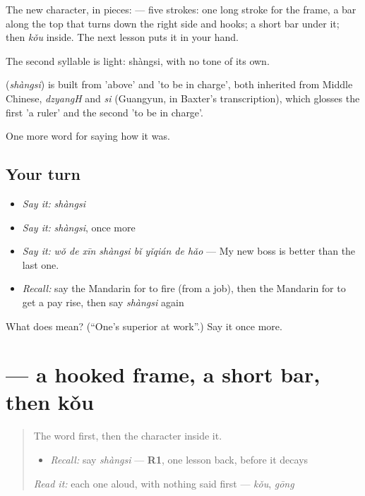 The new character, in pieces:  — five strokes: one long stroke for the frame, a bar along the top that turns down the right side and hooks; a short bar under it; then  \emph{kǒu} inside. The next lesson puts it in your hand.

The second syllable is light: shàngsi, with no tone of its own.

\begin{cousinweb}
\textbf{} (\emph{shàngsi}) is built from  'above' and  'to be in charge', both inherited from Middle Chinese, \emph{dzyangH} and \emph{si} (Guangyun, in Baxter's transcription), which glosses the first 'a ruler' and the second 'to be in charge'.
\end{cousinweb}

\begin{grammarlens}[title={What you've built}]
One more word for saying how it was.
\end{grammarlens}

\subsection*{Your turn}
\begin{itemize}
\raggedright
  \item \emph{Say it:} \emph{shàngsi}
  \item \emph{Say it:} \emph{shàngsi}, once more
  \item \emph{Say it:} \emph{wǒ de xīn shàngsi bǐ yǐqián de hǎo} — My new boss is better than the last one.
  \item \emph{Recall:} say the Mandarin for to fire (from a job), then the Mandarin for to get a pay rise, then say \emph{shàngsi} again
\end{itemize}

\begin{tcolorbox}[breakable,colback=teal!4,colframe=teal!35!black,title={Before you move on}]
What does  mean? (\textquotedblleft{}One's superior at work\textquotedblright{}.) Say it once more.
\end{tcolorbox}
\section[\texorpdfstring{\zh{司} (sī)}{司 (sī)}]{ — a hooked frame, a short bar, then kǒu}

\label{lesson:ZH-W491-si-charge}



\begin{quote}
The word first, then the character inside it.

\begin{itemize}
\raggedright
  \item \emph{Recall:} say \emph{shàngsi} — \textbf{R1}, one lesson back, before it decays
\end{itemize}

\begin{quote}
 
\end{quote}

\emph{Read it:} each one aloud, with nothing said first — \emph{kǒu}, \emph{gōng}
\end{quote}

